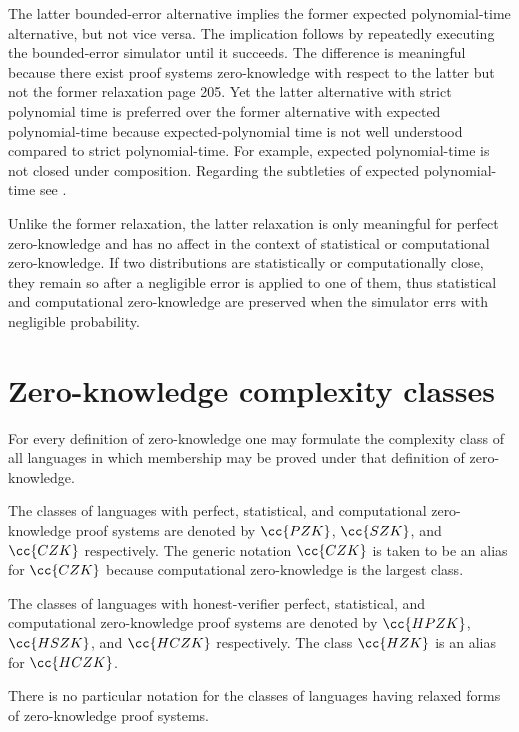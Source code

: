 The latter bounded-error alternative implies the former expected polynomial-time alternative, but not vice versa.
The implication follows by repeatedly executing the bounded-error simulator until it succeeds.
The difference is meaningful because there exist proof systems zero-knowledge with respect to the latter but not the former relaxation \cite{Gol01} page 205.
Yet the latter alternative with strict polynomial time is preferred over the former alternative with expected polynomial-time because expected-polynomial time is not well understood compared to strict polynomial-time.
For example, expected polynomial-time is not closed under composition.
Regarding the subtleties of expected polynomial-time see \cite{Gol11}.

Unlike the former relaxation, the latter relaxation is only meaningful for perfect zero-knowledge and has no affect in the context of statistical or computational zero-knowledge.
If two distributions are statistically or computationally close, they remain so after a negligible error is applied to one of them, thus statistical and computational zero-knowledge are preserved when the simulator errs with negligible probability.


\section{Zero-knowledge complexity classes}

For every definition of zero-knowledge one may formulate the complexity class of all languages in which membership may be proved under that definition of zero-knowledge.

\begin{definition}
    The classes of languages with perfect, statistical, and computational zero-knowledge proof systems are denoted by $\cc{PZK}$, $\cc{SZK}$, and $\cc{CZK}$ respectively.
    The generic notation $\cc{CZK}$ is taken to be an alias for $\cc{CZK}$ because computational zero-knowledge is the largest class.

    The classes of languages with honest-verifier perfect, statistical, and computational zero-knowledge proof systems are denoted by $\cc{HPZK}$, $\cc{HSZK}$, and $\cc{HCZK}$ respectively.
    The class $\cc{HZK}$ is an alias for $\cc{HCZK}$.

    There is no particular notation for the classes of languages having relaxed forms of zero-knowledge proof systems.
\end{definition}

